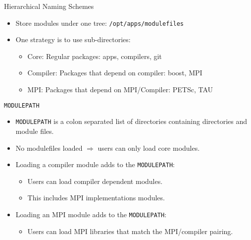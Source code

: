 \documentclass{beamer}
\begin{document}
\begin{frame}{Hierarchical Naming Schemes}
  \begin{itemize}
    \item Store modules under one tree: \texttt{/opt/apps/modulefiles}
    \item One strategy is to use sub-directories:
      \begin{itemize}
        \item Core: Regular packages: apps, compilers, git
        \item Compiler: Packages that depend on compiler: boost, MPI
        \item MPI: Packages that depend on MPI/Compiler: PETSc, TAU
      \end{itemize}

  \end{itemize}
\end{frame}

\begin{frame}{\texttt{MODULEPATH}}
  \begin{itemize}
    \item \texttt{MODULEPATH} is a colon separated list of directories
      containing directories and module files.
    \item No modulefiles loaded $\Rightarrow$ users can only load core modules.
    \item Loading a compiler module adds to the \texttt{MODULEPATH}:
      \begin{itemize}
        \item Users can load compiler dependent modules.
        \item This includes MPI implementations modules.
      \end{itemize}
    \item Loading an MPI module adds to the \texttt{MODULEPATH}:
      \begin{itemize}
        \item Users can load MPI libraries that match the MPI/compiler pairing.
      \end{itemize}
  \end{itemize}
\end{frame}
\end{document}
